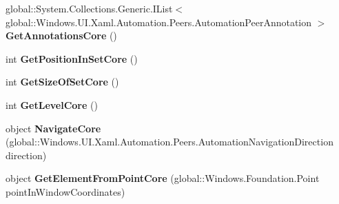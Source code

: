 \begin{DoxyCompactItemize}
\item 
\mbox{\label{interface_windows_1_1_u_i_1_1_xaml_1_1_automation_1_1_peers_1_1_i_automation_peer_overrides3_aa6a79c57927a7424350ddd2c262d71c2}} 
global\+::\+System.\+Collections.\+Generic.\+I\+List$<$ global\+::\+Windows.\+U\+I.\+Xaml.\+Automation.\+Peers.\+Automation\+Peer\+Annotation $>$ {\bfseries Get\+Annotations\+Core} ()
\item 
\mbox{\label{interface_windows_1_1_u_i_1_1_xaml_1_1_automation_1_1_peers_1_1_i_automation_peer_overrides3_afef3ad83240660e412bb003fdb94af98}} 
int {\bfseries Get\+Position\+In\+Set\+Core} ()
\item 
\mbox{\label{interface_windows_1_1_u_i_1_1_xaml_1_1_automation_1_1_peers_1_1_i_automation_peer_overrides3_a3ca3266f1f29e7576d6e7037cb4e1d77}} 
int {\bfseries Get\+Size\+Of\+Set\+Core} ()
\item 
\mbox{\label{interface_windows_1_1_u_i_1_1_xaml_1_1_automation_1_1_peers_1_1_i_automation_peer_overrides3_a52902ce9fb7640616f2937232f64cb71}} 
int {\bfseries Get\+Level\+Core} ()
\item 
\mbox{\label{interface_windows_1_1_u_i_1_1_xaml_1_1_automation_1_1_peers_1_1_i_automation_peer_overrides3_ab89d7e1926fed035b4d1e4a6ebd84e6a}} 
object {\bfseries Navigate\+Core} (global\+::\+Windows.\+U\+I.\+Xaml.\+Automation.\+Peers.\+Automation\+Navigation\+Direction direction)
\item 
\mbox{\label{interface_windows_1_1_u_i_1_1_xaml_1_1_automation_1_1_peers_1_1_i_automation_peer_overrides3_a22a573b6a3dbcdc3cda6486e9dffb748}} 
object {\bfseries Get\+Element\+From\+Point\+Core} (global\+::\+Windows.\+Foundation.\+Point point\+In\+Window\+Coordinates)
\item 

\end{DoxyCompactItemize}

